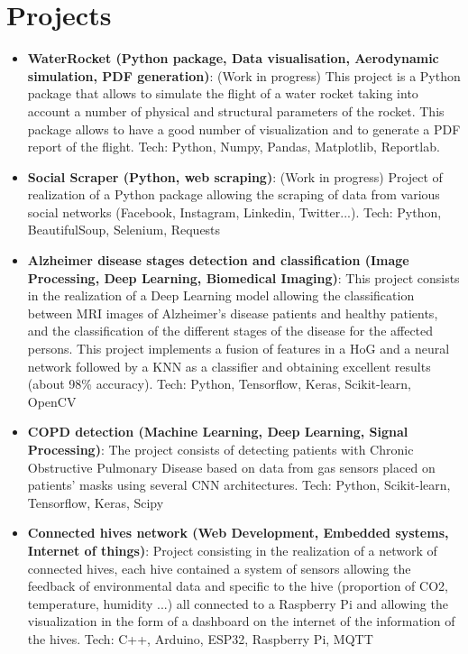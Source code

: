 \documentclass[a4paper,20pt]{article}
\newcommand{\resumeItem}[2]{
  \item\small{
    \textbf{#1}{: #2 \vspace{-2pt}}
  }
}
\newcommand{\resumeSubItem}[2]{\resumeItem{#1}{#2}\vspace{-3pt}}
\newcommand{\resumeSubHeadingListStart}{\begin{itemize}[leftmargin=*]}
\newcommand{\resumeSubHeadingListEnd}{\end{itemize}}
\begin{document}
\section{Projects}
\resumeSubHeadingListStart
\resumeSubItem{WaterRocket (Python package, Data visualisation, Aerodynamic simulation, PDF generation)}{(Work in progress) This project is a Python package that allows to simulate the flight of a water rocket taking into account a number of physical and structural parameters of the rocket. This package allows to have a good number of visualization and to generate a PDF report of the flight. Tech: Python, Numpy, Pandas, Matplotlib, Reportlab.}
\vspace{2pt}
\resumeSubItem{Social Scraper (Python, web scraping)}{(Work in progress) Project of realization of a Python package allowing the scraping of data from various social networks (Facebook, Instagram, Linkedin, Twitter...). Tech: Python, BeautifulSoup, Selenium, Requests}
\vspace{2pt}
\resumeSubItem{Alzheimer disease stages detection and classification (Image Processing, Deep Learning, Biomedical Imaging)}{This project consists in the realization of a Deep Learning model allowing the classification between MRI images of Alzheimer's disease patients and healthy patients, and the classification of the different stages of the disease for the affected persons. This project implements a fusion of features in a HoG and a neural network followed by a KNN as a classifier and obtaining excellent results (about 98\% accuracy). Tech: Python, Tensorflow, Keras, Scikit-learn, OpenCV}
\vspace{2pt}
\resumeSubItem{COPD detection (Machine Learning, Deep Learning, Signal Processing)}{The project consists of detecting patients with Chronic Obstructive Pulmonary Disease based on data from gas sensors placed on patients' masks using several CNN architectures. Tech: Python, Scikit-learn, Tensorflow, Keras, Scipy}
\vspace{2pt}
\resumeSubItem{Connected hives network (Web Development, Embedded systems, Internet of things)}{Project consisting in the realization of a network of connected hives, each hive contained a system of sensors allowing the feedback of environmental data and specific to the hive (proportion of CO2, temperature, humidity ...) all connected to a Raspberry Pi and allowing the visualization in the form of a dashboard on the internet of the information of the hives. Tech: C++, Arduino, ESP32, Raspberry Pi, MQTT}
\resumeSubHeadingListEnd
\end{document}
